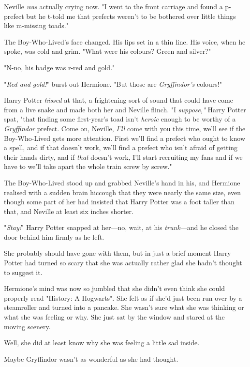 Neville \emph{was} actually crying now. "I went to the front carriage and found a p-prefect but he t-told me that prefects weren't to be bothered over little things like m-missing toads."

The Boy-Who-Lived's face changed. His lips set in a thin line. His voice, when he spoke, was cold and grim. "What were his colours? Green and silver?"

"N-no, his badge was r-red and gold."

"\emph{Red and gold!}" burst out Hermione. "But those are \emph{Gryffindor's} colours!"

Harry Potter \emph{hissed} at that, a frightening sort of sound that could have come from a live snake and made both her and Neville flinch. "I \emph{suppose,"} Harry Potter spat, "that finding some first-year's toad isn't \emph{heroic} enough to be worthy of a \emph{Gryffindor} prefect. Come on, Neville, \emph{I'll} come with you this time, we'll see if the Boy-Who-Lived gets more attention. First we'll find a prefect who ought to know a spell, and if that doesn't work, we'll find a prefect who isn't afraid of getting their hands dirty, and if \emph{that} doesn't work, I'll start recruiting my fans and if we have to we'll take apart the whole train screw by screw."

The Boy-Who-Lived stood up and grabbed Neville's hand in his, and Hermione realised with a sudden brain hiccough that they were nearly the same size, even though some part of her had insisted that Harry Potter was a foot taller than that, and Neville at least six inches shorter.

"\emph{Stay!}" Harry Potter snapped at her---no, wait, at his \emph{trunk}---and he closed the door behind him firmly as he left.

She probably should have gone with them, but in just a brief moment Harry Potter had turned so scary that she was actually rather glad she hadn't thought to suggest it.

Hermione's mind was now so jumbled that she didn't even think she could properly read "History: A Hogwarts". She felt as if she'd just been run over by a steamroller and turned into a pancake. She wasn't sure what she was thinking or what she was feeling or why. She just sat by the window and stared at the moving scenery.

Well, she did at least know why she was feeling a little sad inside.

Maybe Gryffindor wasn't as wonderful as she had thought.